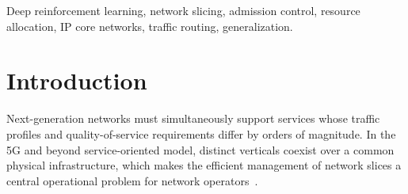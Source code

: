 \documentclass[10pt,journal,comsoc]{IEEEtran}
\begin{document}
\begin{abstract}
Q-estimators trained from separate replay buffers. On a real operator
topology the joint agent admits $3.6\%$ more slices than a strong
bottleneck-aware greedy policy (paired over five seeds, $t=7.44$), and
this advantage replicates at $3.8\%$ on a structurally different
synthetic topology. We show \emph{why}: the learned policy performs
non-myopic admissibility preservation, keeping $54.9\%$ of arrivals
routable against $46.2\%$ under greedy, a behaviour a myopic heuristic
cannot reproduce. We further show that the additional value of learning
routing jointly with admission is \emph{conditional} on the substrate
offering routing headroom, which we quantify with a statistic $\rho$
measurable without training: on the operator topology $\rho=11.0\%$ and
joint control outperforms admission-only control by $7.4\%$, whereas on
a topology with $\rho=0\%$ the admission-only agent is the stronger
design. Finally, the factored architecture matches the unified one for
small action spaces and is robust as the number of candidate paths
grows, where the unified agent degrades by $2.6\%$.
\end{abstract}
\IEEEpubidadjcol
\begin{IEEEkeywords}
Deep reinforcement learning, network slicing, admission control,
resource allocation, IP core networks, traffic routing, generalization.
\end{IEEEkeywords}

\section{Introduction}
Next-generation networks must simultaneously support services whose
traffic profiles and quality-of-service requirements differ by orders of
magnitude. In the 5G and beyond service-oriented model, distinct
verticals coexist over a common physical infrastructure, which makes the
efficient management of network slices a central operational problem for
network operators~\cite{guan2021customized,bernardez2021machine}.
\end{document}
